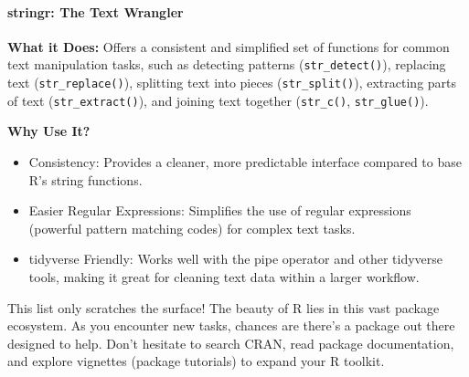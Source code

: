 \paragraph{stringr: The Text Wrangler}

\textbf{What it Does:} Offers a consistent and simplified set of functions for common text manipulation tasks, such as detecting patterns (\texttt{str\_detect()}), replacing text (\texttt{str\_replace()}), splitting text into pieces (\texttt{str\_split()}), extracting parts of text (\texttt{str\_extract()}), and joining text together (\texttt{str\_c()}, \texttt{str\_glue()}).

\textbf{Why Use It?}
\begin{itemize}
    \item Consistency: Provides a cleaner, more predictable interface compared to base R’s string functions.
    \item Easier Regular Expressions: Simplifies the use of regular expressions (powerful pattern matching codes) for complex text tasks.
    \item tidyverse Friendly: Works well with the pipe operator and other tidyverse tools, making it great for cleaning text data within a larger workflow.
\end{itemize}

This list only scratches the surface! The beauty of R lies in this vast package ecosystem. As you encounter new tasks, chances are there’s a package out there designed to help. Don’t hesitate to search CRAN, read package documentation, and explore vignettes (package tutorials) to expand your R toolkit.